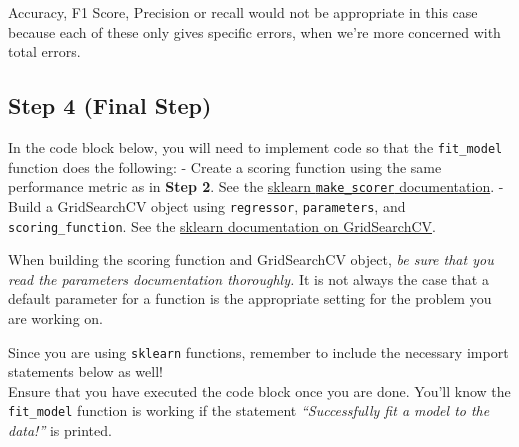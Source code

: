 \documentclass{article}
\begin{document}
Accuracy, F1 Score, Precision or recall would not be appropriate in this
case because each of these only gives specific errors, when we're more
concerned with total errors.

    \subsection{Step 4 (Final Step)}\label{step-4-final-step}

In the code block below, you will need to implement code so that the
\texttt{fit\_model} function does the following: - Create a scoring
function using the same performance metric as in \textbf{Step 2}. See
the
\href{http://scikit-learn.org/stable/modules/generated/sklearn.metrics.make_scorer.html}{sklearn
\texttt{make\_scorer} documentation}. - Build a GridSearchCV object
using \texttt{regressor}, \texttt{parameters}, and
\texttt{scoring\_function}. See the
\href{http://scikit-learn.org/stable/modules/generated/sklearn.grid_search.GridSearchCV.html}{sklearn
documentation on GridSearchCV}.

When building the scoring function and GridSearchCV object, \emph{be
sure that you read the parameters documentation thoroughly.} It is not
always the case that a default parameter for a function is the
appropriate setting for the problem you are working on.

Since you are using \texttt{sklearn} functions, remember to include the
necessary import statements below as well!\\
Ensure that you have executed the code block once you are done. You'll
know the \texttt{fit\_model} function is working if the statement
\emph{``Successfully fit a model to the data!''} is printed.
\end{document}
